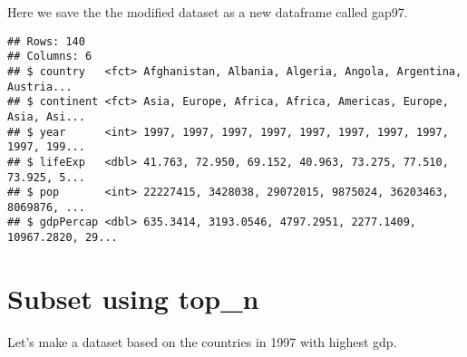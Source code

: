 \documentclass[
]{book}
\newenvironment{Shaded}{\begin{snugshade}}{\end{snugshade}}
\newcommand{\CommentTok}[1]{\textcolor[rgb]{0.56,0.35,0.01}{\textit{#1}}}
\newcommand{\DataTypeTok}[1]{\textcolor[rgb]{0.13,0.29,0.53}{#1}}
\newcommand{\DecValTok}[1]{\textcolor[rgb]{0.00,0.00,0.81}{#1}}
\newcommand{\KeywordTok}[1]{\textcolor[rgb]{0.13,0.29,0.53}{\textbf{#1}}}
\newcommand{\NormalTok}[1]{#1}
\newcommand{\OperatorTok}[1]{\textcolor[rgb]{0.81,0.36,0.00}{\textbf{#1}}}
\newcommand{\StringTok}[1]{\textcolor[rgb]{0.31,0.60,0.02}{#1}}
\begin{document}
Here we save the the modified dataset as a new dataframe called gap97.

\begin{Shaded}
\end{Shaded}

\begin{verbatim}
## Rows: 140
## Columns: 6
## $ country   <fct> Afghanistan, Albania, Algeria, Angola, Argentina, Austria...
## $ continent <fct> Asia, Europe, Africa, Africa, Americas, Europe, Asia, Asi...
## $ year      <int> 1997, 1997, 1997, 1997, 1997, 1997, 1997, 1997, 1997, 199...
## $ lifeExp   <dbl> 41.763, 72.950, 69.152, 40.963, 73.275, 77.510, 73.925, 5...
## $ pop       <int> 22227415, 3428038, 29072015, 9875024, 36203463, 8069876, ...
## $ gdpPercap <dbl> 635.3414, 3193.0546, 4797.2951, 2277.1409, 10967.2820, 29...
\end{verbatim}

\hypertarget{subset-using-top_n}{%
\section{Subset using top\_n}\label{subset-using-top_n}}

Let's make a dataset based on the countries in 1997 with highest gdp.

\begin{Shaded}
\end{Shaded}
\end{document}
